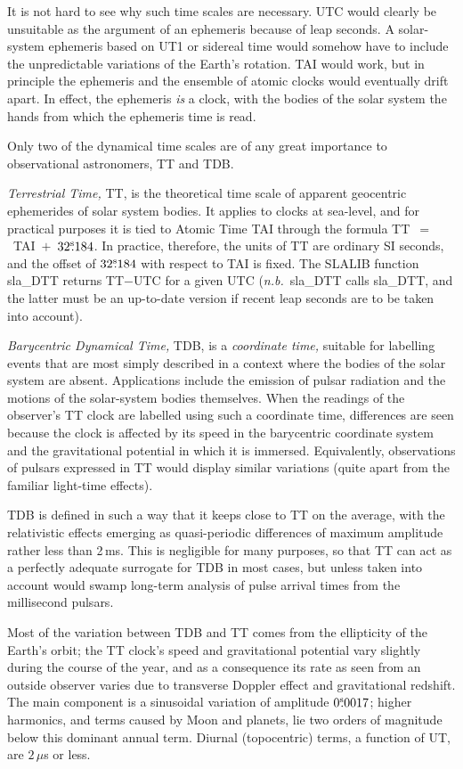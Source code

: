\documentclass[11pt,twoside]{article}
\newcommand{\tseci}[1]   {$#1$\mbox{$^{\rm s}$}}
\newcommand{\tsec}[2]    {\tseci{#1}$\hspace{-0.3em}.#2$}
\renewcommand{\tsec}[2] {$#1^{\rm s}\hspace{-0.3em}.#2$}
\begin{document}
It is not hard to see why such time scales are necessary.
UTC would clearly be unsuitable as the argument of an
ephemeris because of leap seconds.
A solar-system ephemeris based on UT1 or sidereal time would somehow
have to include the unpredictable variations of the Earth's rotation.
TAI would work, but in principle
the ephemeris and the ensemble of atomic clocks would
eventually drift apart.
In effect, the ephemeris {\it is}\/ a clock, with the bodies of
the solar system the hands from which the ephemeris time is read.

Only two of the dynamical time scales are of any great importance to
observational astronomers, TT and TDB.

{\it Terrestrial Time,} TT, is
the theoretical time scale of apparent geocentric ephemerides of solar
system bodies.  It applies to clocks at sea-level, and for practical purposes
it is tied to
Atomic Time TAI through the formula TT~$=$~TAI~$+$~\tsec{32}{184}.
In practice, therefore, the units of TT are ordinary SI seconds, and
the offset of \tsec{32}{184} with respect to TAI is fixed.
The SLALIB function
sla\_DTT
returns TT$-$UTC for a given UTC
({\it n.b.}~sla\_DTT
calls
sla\_DTT,
and the latter must be an up-to-date version if recent leap seconds are
to be taken into account).

{\it Barycentric Dynamical Time,} TDB, is a
{\it coordinate time,} suitable
for labelling events that are most simply described in a context
where the bodies of the solar system
are absent.  Applications include
the emission of pulsar radiation and the motions of the
solar-system bodies themselves.  When the readings of the
observer's TT clock are labelled using such a
coordinate time, differences
are seen because the clock is affected by its
speed in the barycentric coordinate system
and the gravitational potential in which it is immersed.  Equivalently,
observations of pulsars
expressed in TT would display similar variations (quite
apart from the familiar light-time effects).

TDB is defined in such a way that it keeps close to TT
on the average, with the relativistic effects emerging as
quasi-periodic differences of maximum amplitude rather less
than 2\,ms.  This is
negligible for many purposes, so that TT can act as
a perfectly adequate surrogate for TDB in most cases,
but unless taken into
account would swamp
long-term analysis of pulse arrival times from the
millisecond pulsars.

Most of the variation between TDB and TT comes from the ellipticity of
the Earth's orbit;  the TT clock's speed and
gravitational potential vary slightly
during the course of the year, and as a consequence
its rate as seen from an outside observer
varies due to transverse Doppler effect and gravitational
redshift.  The main component is a sinusoidal variation of
amplitude \tsec{0}{0017};  higher harmonics, and terms
caused by Moon and planets, lie two orders of magnitude below
this dominant annual term.  Diurnal (topocentric) terms, a
function of UT, are $2\,\mu$s or less.
\end{document}
